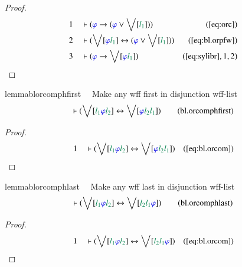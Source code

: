 \begin{proof}
\begin{align}
  1 &&  & \vdash ( \mw{\varphi} \rightarrow ( \mw{\varphi} \vee \bigvee[
      \mwl{l_1} ] ) )&(\mbox{\ref{eq:orc}})\notag
  \\ 2 &&  & \vdash ( \bigvee[ \mw{\varphi} \mwl{l_1} ] \leftrightarrow (
      \mw{\varphi} \vee \bigvee[ \mwl{l_1} ] )
      )&(\mbox{\ref{eq:bl.orpfw}})\notag
  \\ 3 &&  & \vdash ( \mw{\varphi} \rightarrow \bigvee[ \mw{\varphi} \mwl{l_1}
      ] )&(\mbox{\ref{eq:sylibr}},1,2)\notag
\end{align}
\end{proof}

\begin{restatable}{lemma}{blorcomphfirst}~~ Make any wff first in disjunction
wff-list
\begin{align}
\vdash ( \bigvee[ \mwl{l_1} \mw{\varphi} \mwl{l_2} ] \leftrightarrow \bigvee[
    \mw{\varphi} \mwl{l_2} \mwl{l_1} ]
    )\label{eq:bl.orcomphfirst}\tag{bl.orcomphfirst}
\end{align}
\end{restatable}

\begin{proof}
\begin{align}
  1 &&  & \vdash ( \bigvee[ \mwl{l_1} \mw{\varphi} \mwl{l_2} ] \leftrightarrow
      \bigvee[ \mw{\varphi} \mwl{l_2} \mwl{l_1} ]
      )&(\mbox{\ref{eq:bl.orcom}})\notag
\end{align}
\end{proof}

\begin{restatable}{lemma}{blorcomphlast}~~ Make any wff last in disjunction
wff-list
\begin{align}
\vdash ( \bigvee[ \mwl{l_1} \mw{\varphi} \mwl{l_2} ] \leftrightarrow \bigvee[
    \mwl{l_2} \mwl{l_1} \mw{\varphi} ]
    )\label{eq:bl.orcomphlast}\tag{bl.orcomphlast}
\end{align}
\end{restatable}

\begin{proof}
\begin{align}
  1 &&  & \vdash ( \bigvee[ \mwl{l_1} \mw{\varphi} \mwl{l_2} ] \leftrightarrow
      \bigvee[ \mwl{l_2} \mwl{l_1} \mw{\varphi} ]
      )&(\mbox{\ref{eq:bl.orcom}})\notag
\end{align}
\end{proof}

